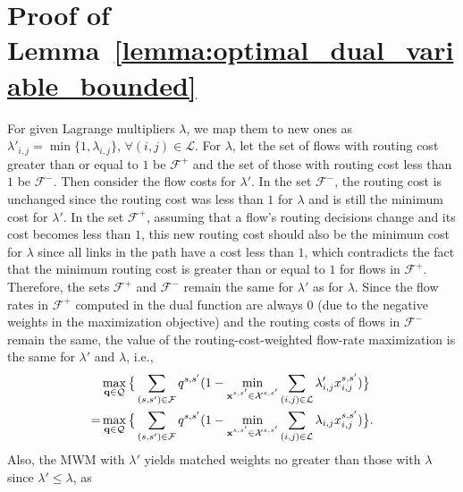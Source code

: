 \documentclass[journal]{IEEEtran}
\begin{document}
\appendices

\section{Proof of Lemma~\ref{lemma:optimal_dual_variable_bounded}}
\label{appendix:proof:lemma:optimal_dual_variable_bounded}
For given Lagrange multipliers $\lambda$, we map them to new ones as $\lambda'_{i,j} = \min\{1, \lambda_{i,j}\}$, $\forall (i,j)\in\mathcal{L}$.
For $\lambda$, let the set of flows with routing cost greater than or equal to $1$ be $\mathcal{F}^+$ and the set of those with routing cost less than $1$ be $\mathcal{F}^-$. Then consider the flow costs for $\lambda'$. In the set $\mathcal{F}^-$, the routing cost is unchanged since the routing cost was less than $1$ for $\lambda$ and is still the minimum cost for $\lambda'$.
In the set $\mathcal{F}^+$, assuming that a flow's routing decisions change and its cost becomes less than $1$, this new routing cost should also be the minimum cost for $\lambda$ since all links in the path have a cost less than $1$, which contradicts the fact that the minimum routing cost is greater than or equal to $1$ for flows in $\mathcal{F}^+$.
Therefore, the sets $\mathcal{F}^+$ and $\mathcal{F}^-$ remain the same for $\lambda'$ as for $\lambda$.
Since the flow rates in $\mathcal{F}^+$ computed in the dual function are always $0$ (due to the negative weights in the maximization objective) and the routing costs of flows in $\mathcal{F}^-$ remain the same, the value of the routing-cost-weighted flow-rate maximization is the same for $\lambda'$ and $\lambda$, i.e.,
\begin{equation}
  \begin{aligned}
      &\max_{
        \substack{
          \mathbf{q}\in \mathcal{Q}
        }
      }
      \big\{
      \sum_{(s,s')\in\mathcal{F} } q^{s,s'} (1 - \min_{
        \substack{
          \mathbf{x}^{s,s'}\in\mathcal{X}^{s,s'}
        }
      }
      \sum_{(i,j)\in\mathcal{L}}\lambda'_{i,j} x^{s,s'}_{i,j})   
      \big\}\\
      =
      &\max_{
        \substack{
          \mathbf{q}\in \mathcal{Q}
        }
      }
      \big\{
      \sum_{(s,s')\in\mathcal{F} } q^{s,s'} (1 - \min_{
        \substack{
          \mathbf{x}^{s,s'}\in\mathcal{X}^{s,s'}
        }
      }
      \sum_{(i,j)\in\mathcal{L}}\lambda_{i,j} x^{s,s'}_{i,j})   
      \big\}.
\end{aligned}
\notag
\end{equation}
Also, the MWM with $\lambda'$ yields matched weights no greater than those with $\lambda$ since $\lambda'\leq\lambda$, as
\end{document}
